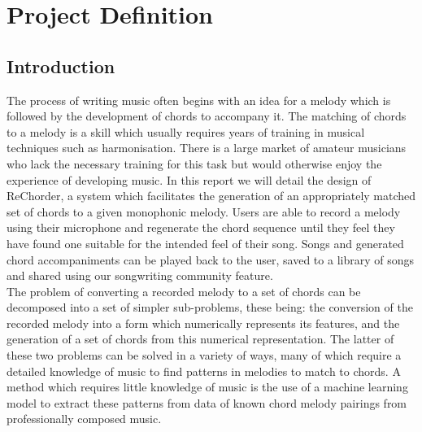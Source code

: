 
\chapter{Project Definition} %
\label{Chapter1} %

\section{Introduction}
The process of writing music often begins with an idea for a melody which is followed by the development of chords to accompany it.
The matching of chords to a melody is a skill which usually requires years of training in musical techniques such as harmonisation.
There is a large market of amateur musicians who lack the necessary training for this task but would otherwise enjoy the experience of developing music.  
In this report we will detail the design of ReChorder, a system which facilitates the generation of an appropriately matched set of chords to a given monophonic melody.
Users are able to record a melody using their microphone and regenerate the chord sequence until they feel they have found one suitable for the intended feel of their song.
Songs and generated chord accompaniments can be played back to the user, saved to a library of songs and shared using our songwriting community feature. \\
The problem of converting a recorded melody to a set of chords can be decomposed into a set of simpler sub-problems, these being:
the conversion of the recorded melody into a form which numerically represents its features,
and the generation of a set of chords from this numerical representation.
The latter of these two problems can be solved in a variety of ways, many of which require a detailed knowledge of music to find patterns in melodies to match to chords.  
A method which requires little knowledge of music is the use of a machine learning model to extract these patterns from data of known chord melody pairings from professionally composed music. 
